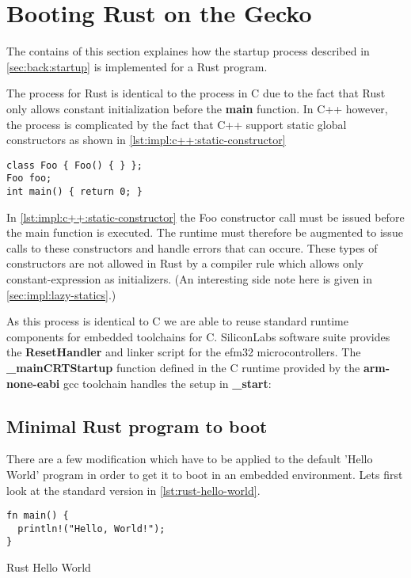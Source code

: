 \section{Booting Rust on the Gecko}
\label{sec:impl:booting}

The contains of this section explaines how the startup process described in \autoref{sec:back:startup} is implemented for a Rust program.

The process for Rust is identical to the process in C due to the fact that Rust only allows constant initialization before the \textbf{main} function.
In C++ however, the process is complicated by the fact that C++ support static global constructors as shown in \autoref{lst:impl:c++:static-constructor}

\begin{listing}[H]
  \begin{verbatim}
class Foo { Foo() { } };
Foo foo;
int main() { return 0; }
  \end{verbatim}
  \caption{}
  \label{lst:impl:c++:static-constructor}
\end{listing}

In \autoref{lst:impl:c++:static-constructor} the Foo constructor call must be issued before the main function is executed.
The runtime must therefore be augmented to issue calls to these constructors and handle errors that can occure.
These types of constructors are not allowed in Rust by a compiler rule which allows only constant-expression as initializers.
(An interesting side note here is given in \autoref{sec:impl:lazy-statics}.)

As this process is identical to C we are able to reuse standard runtime components for embedded toolchains for C.
SiliconLabs software suite provides the \textbf{ResetHandler} and linker script for the efm32 microcontrollers.
The \textbf{\_mainCRTStartup} function defined in the C runtime provided by the \textbf{arm-none-eabi} gcc toolchain handles the setup in \textbf{\_start}:

\subsection{Minimal Rust program to boot}

There are a few modification which have to be applied to the default 'Hello World' program in order to get it to boot in an embedded environment.
Lets first look at the standard version in \autoref{lst:rust-hello-world}.

\begin{listing}[H]
\begin{verbatim}
fn main() {
  println!("Hello, World!");
}
\end{verbatim}
\label{lst:rust-hello-world}
\caption{Rust Hello World}
\end{listing}

